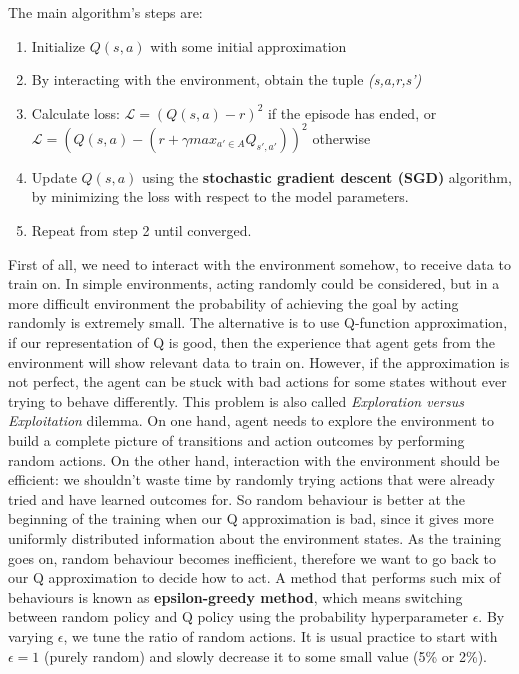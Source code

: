 \documentclass[12pt]{article}
\begin{document}
The main algorithm's steps are:
\begin{enumerate}
    \item Initialize $Q(s,a)$ with some initial approximation
    \item By interacting with the environment, obtain the tuple \textit{(s,a,r,s')}
    \item Calculate loss: $\mathcal{L} =(Q(s,a)-r)^2$ if the episode has ended, or $\mathcal{L} =(Q(s,a)-(r+\gamma max_{a' \in A} Q_{s',a'}))^2$ otherwise
    \item Update $Q(s,a)$ using the \textbf{stochastic gradient descent (SGD)} algorithm, by minimizing the loss with respect to the model parameters.
    \item Repeat from step 2 until converged.
\end{enumerate}

First of all, we need to interact with the environment somehow, to receive data to train on. In simple environments, acting randomly could be considered, but in a more difficult environment the probability of achieving the goal by acting randomly is extremely small. The alternative is to use Q-function approximation, if our representation of Q is good, then the experience that agent gets from the environment will show relevant data to train on. However, if the approximation is not perfect, the agent can be stuck with bad actions for some states without ever trying to behave differently. This problem is also called \textit{Exploration versus Exploitation} dilemma. On one hand, agent needs to explore the environment to build a complete picture of transitions and action outcomes by performing random actions. On the other hand, interaction with the environment should be efficient: we shouldn't waste time by randomly trying actions that were already tried and have learned outcomes for. 
So random behaviour is better at the beginning of the training when our Q approximation is bad, since it gives more uniformly distributed information about the environment states. As the training goes on, random behaviour becomes inefficient, therefore we want to go back to our Q approximation to decide how to act.
A method that performs such mix of behaviours is known as \textbf{epsilon-greedy method}, which means switching between random policy and Q policy using the probability hyperparameter $\epsilon$. By varying $\epsilon$, we tune the ratio of random actions. It is usual practice to start with $\epsilon = 1$ (purely random) and slowly decrease it to some small value (5\% or 2\%).
\end{document}
